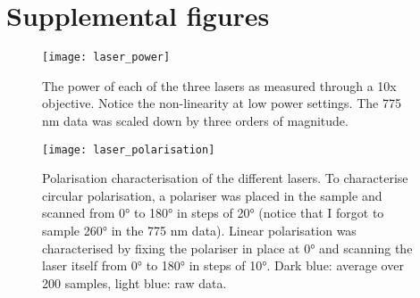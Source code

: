 \chapter{Supplemental figures}


\begin{figure}[ht]
	\centering
	\texttt{[image: laser\_power]}
	\caption{
		The power of each of the three lasers as measured through a 10x objective. Notice the non-linearity at low power settings. The 775 nm data was scaled down by three orders of magnitude.
	}
	\label{fig:laser power}
\end{figure}

\begin{figure}
	\centering
	\texttt{[image: laser\_polarisation]}
	\caption{
		Polarisation characterisation of the different lasers. To characterise circular polarisation, a polariser was placed in the sample and scanned from \ang{0} to \ang{180} in steps of \ang{20} (notice that I forgot to sample \ang{260} in the 775 nm data). Linear polarisation was characterised by fixing the polariser in place at \ang{0} and scanning the laser itself from \ang{0} to \ang{180} in steps of \ang{10}. Dark blue: average over 200 samples, light blue: raw data. 
	}
	\label{fig:laser polarisation}
\end{figure}
%
%

